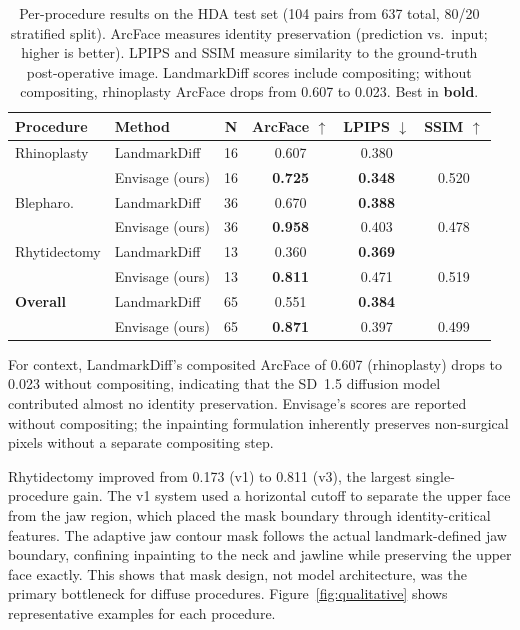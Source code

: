 \documentclass[twocolumn]{article}
\newcommand{\method}{Envisage}
\newcommand{\best}[1]{\textbf{#1}}
\begin{document}
\begin{table}[t]
\centering
\caption{Per-procedure results on the HDA test set (104 pairs from
637 total, 80/20 stratified split). ArcFace measures identity preservation
(prediction vs.\ input; higher is better). LPIPS and SSIM measure
similarity to the ground-truth post-operative image. LandmarkDiff scores
include compositing; without compositing, rhinoplasty ArcFace drops from
0.607 to 0.023. Best in \textbf{bold}.}
\label{tab:main_results}
\begin{tabular}{@{}llcccc@{}}
\toprule
\textbf{Procedure} & \textbf{Method} & \textbf{N} &
\textbf{ArcFace} $\uparrow$ & \textbf{LPIPS} $\downarrow$ &
\textbf{SSIM} $\uparrow$ \\
\midrule
Rhinoplasty  & LandmarkDiff         & 16 & 0.607          & 0.380          &       \\
             & \method{} (ours)     & 16 & \best{0.725}   & \best{0.348}   & 0.520 \\
\midrule
Blepharo.    & LandmarkDiff         & 36 & 0.670          & \best{0.388}   &       \\
             & \method{} (ours)     & 36 & \best{0.958}   & 0.403          & 0.478 \\
\midrule
Rhytidectomy & LandmarkDiff         & 13 & 0.360          & \best{0.369}   &       \\
             & \method{} (ours)     & 13 & \best{0.811}   & 0.471          & 0.519 \\
\midrule
\textbf{Overall} & LandmarkDiff     & 65 & 0.551         & \best{0.384}   &       \\
                 & \method{} (ours) & 65 & \best{0.871}  & 0.397          & 0.499 \\
\bottomrule
\end{tabular}
\end{table}

For context, LandmarkDiff's composited ArcFace of 0.607 (rhinoplasty)
drops to 0.023 without compositing, indicating that the SD~1.5 diffusion
model contributed almost no identity preservation. \method{}'s scores
are reported without compositing; the inpainting formulation inherently
preserves non-surgical pixels without a separate compositing step.

Rhytidectomy improved from 0.173 (v1) to 0.811 (v3), the largest
single-procedure gain. The v1 system used a horizontal cutoff to separate
the upper face from the jaw region, which placed the mask boundary through
identity-critical features. The adaptive jaw contour mask follows the
actual landmark-defined jaw boundary, confining inpainting to the neck and
jawline while preserving the upper face exactly. This shows that
mask design, not model architecture, was the primary bottleneck for
diffuse procedures. Figure~\ref{fig:qualitative} shows representative
examples for each procedure.
\end{document}
